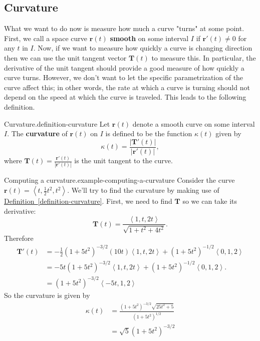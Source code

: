 \documentclass[10pt,]{book}
\newcommand{\terminology}[1]{\textbf{#1}}
\numberwithin{equation}{section}
\newcommand{\vv}[1]{\mathbf{#1}}
\newcommand{\dotprod}[1]{\left\langle #1 \right\rangle}
\begin{document}
\subsection[{Curvature}]{Curvature}\label{subsection-curvature}
\hypertarget{p-1285}{}%
What we want to do now is measure how much a curve "turns" at some point. First, we call a space curve \(\vv{r}(t)\) \terminology{smooth} on some interval \(I\) if \(\vv{r}'(t)\neq0\) for any \(t\) in \(I\). Now, if we want to measure how quickly a curve is changing direction then we can use the unit tangent vector \(\vv{T}(t)\) to measure this. In particular, the derivative of the unit tangent should provide a good measure of how quickly a curve turns. However, we don't want to let the specific parametrization of the curve affect this; in other words, the rate at which a curve is turning should not depend on the speed at which the curve is traveled. This leads to the following definition.%
\begin{definition}{Curvature.}{definition-curvature}%
\hypertarget{p-1286}{}%
Let \(\vv{r}(t)\) denote a smooth curve on some interval \(I\). The \terminology{curvature} of \(\vv{r}(t)\) on \(I\) is defined to be the function \(\kappa(t)\) given by%
%
\begin{equation*}
\kappa(t) = \frac{|\vv{T}'(t)|}{|\vv{r}'(t)|},
\end{equation*}
\hypertarget{p-1287}{}%
where \(\vv{T}(t) = \frac{\vv{r}'(t)}{|\vv{r}'(t)|}\) is the unit tangent to the curve.%
\end{definition}
\begin{example}{Computing a curvature.}{example-computing-a-curvature}%
\hypertarget{p-1288}{}%
Consider the curve \(\vv{r}(t) = \dotprod{t,\frac{1}{2}t^{2},t^{2}}.\) We'll try to find the curvature by making use of \hyperref[definition-curvature]{Definition~\ref{definition-curvature}}. First, we need to find \(\vv{T}\) so we can take its derivative:%
%
\begin{equation*}
\vv{T}(t) = \frac{\dotprod{1,t,2t}}{\sqrt{1+t^{2}+4t^{2}}}.
\end{equation*}
\hypertarget{p-1289}{}%
Therefore%
%
\begin{align*}
\vv{T}'(t) & = -\frac{1}{2}(1+5t^{2})^{-3/2}(10t)\dotprod{1,t,2t} + (1+5t^{2})^{-1/2}\dotprod{0,1,2} \\
& = -5t(1+5t^{2})^{-3/2}\dotprod{1,t,2t} + (1 + 5t^{2})^{-1/2}\dotprod{0,1,2}. \\
& = (1+5t^{2})^{-3/2}\dotprod{-5t,1,2} 
\end{align*}
\hypertarget{p-1290}{}%
So the curvature is given by%
%
\begin{align*}
\kappa(t) & = \frac{(1+5t^{2})^{-3/2}\sqrt{25t^{2}+5}}{(1+5t^{2})^{1/2}} \\
& = \sqrt{5}(1+5t^{2})^{-3/2} 
\end{align*}
\end{example}
\end{document}
